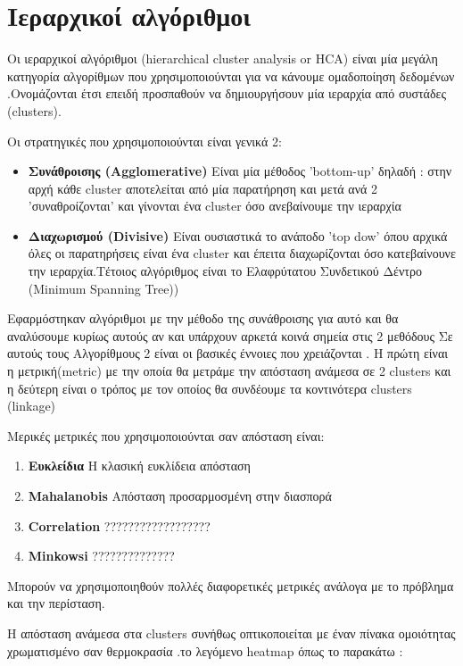 \chapter{Ιεραρχικοί αλγόριθμοι}
Οι ιεραρχικοί αλγόριθμοι (hierarchical cluster analysis or HCA) είναι μία μεγάλη κατηγορία αλγορίθμων που χρησιμοποιούνται για να κάνουμε ομαδοποίηση δεδομένων .Ονομάζονται έτσι επειδή προσπαθούν να δημιουργήσουν μία ιεραρχία από συστάδες (clusters).

Οι στρατηγικές που χρησιμοποιούνται είναι γενικά 2:
\begin{itemize}
\item{ \textbf{Συνάθροισης (Agglomerative)} Είναι μία μέθοδος 'bottom-up' δηλαδή : στην αρχή κάθε cluster αποτελείται από μία παρατήρηση και μετά ανά 2 'συναθροίζονται' και γίνονται ένα cluster όσο ανεβαίνουμε την ιεραρχία  }
\item{}\textbf{Διαχωρισμού (Divisive)} Είναι ουσιαστικά το ανάποδο 'top dow' όπου αρχικά όλες οι παρατηρήσεις είναι ένα cluster και έπειτα διαχωρίζονται όσο κατεβαίνουνε την ιεραρχία.Τέτοιος αλγόριθμος είναι το Ελαφρύτατου Συνδετικού Δέντρο (Minimum Spanning Tree))
\end{itemize}

Εφαρμόστηκαν αλγόριθμοι με την μέθοδο της συνάθροισης για αυτό και θα αναλύσουμε κυρίως   αυτούς αν και υπάρχουν αρκετά κοινά σημεία στις 2 μεθόδους
Σε αυτούς τους Αλγορίθμους 2 είναι οι βασικές έννοιες που χρειάζονται .
Η πρώτη είναι η μετρική(metric) με την οποία θα μετράμε την απόσταση ανάμεσα σε 2 clusters και η δεύτερη είναι ο τρόπος με τον οποίος θα συνδέουμε τα κοντινότερα clusters (linkage)

Μερικές μετρικές που χρησιμοποιούνται σαν απόσταση είναι:
\begin{enumerate}
\item \textbf{Ευκλείδια }H κλασική ευκλίδεια απόσταση
\item \textbf{Mahalanobis }Απόσταση προσαρμοσμένη στην διασπορά
\item \textbf{Correlation }??????????????????
\item \textbf{Minkowsi }  ??????????????
\end{enumerate}
Μπορούν να χρησιμοποιηθούν πολλές διαφορετικές μετρικές ανάλογα με το πρόβλημα και την περίσταση.

\begin{minipage}{\linewidth}%
H απόσταση ανάμεσα στα   clusters  συνήθως οπτικοποιείται με έναν πίνακα ομοιότητας χρωματισμένο σαν θερμοκρασία .το λεγόμενο heatmap  όπως το παρακάτω :
\label{fig:heat1}%
\end{minipage}

